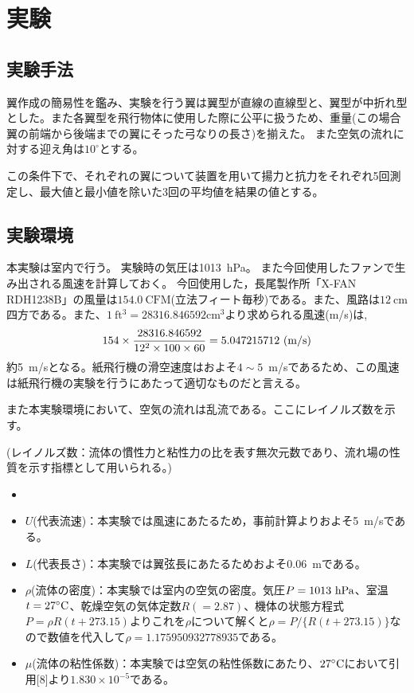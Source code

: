 \documentclass[11pt,b5paper,papersize,dvipdfmx]{jsbook}
\begin{document}
\section{実験}
\subsection{実験手法}
翼作成の簡易性を鑑み、実験を行う翼は翼型が直線の直線型と、翼型が中折れ型とした。また各翼型を飛行物体に使用した際に公平に扱うため、重量(この場合翼の前端から後端までの翼にそった弓なりの長さ)を揃えた。
また空気の流れに対する迎え角は$10^\circ$とする。\par
この条件下で、それぞれの翼について装置を用いて揚力と抗力をそれぞれ5回測定し、最大値と最小値を除いた3回の平均値を結果の値とする。
\subsection{実験環境}
本実験は室内で行う。
実験時の気圧は1013\ hPa。
また今回使用したファンで生み出される風速を計算しておく。
今回使用した，長尾製作所「X-FAN RDH1238B」の風量は$154.0\ \mathrm{CFM}$(立法フィート毎秒)である。また、風路は$12\ \mathrm{cm}$四方である。また、$1\ \mathrm{ft^3}= 28 316.846 592 \mathrm{cm^3}$より求められる風速(m/s)は,
\begin{align*}
  154 \times \frac{28316.846592}{12^2\times 100\times 60} = 5.047215712\ \rm{(m/s)}
\end{align*}
約5\ m/sとなる。紙飛行機の滑空速度はおよそ$4\sim 5$\ m/sであるため、この風速は紙飛行機の実験を行うにあたって適切なものだと言える。\par
 また本実験環境において、空気の流れは乱流である。ここにレイノルズ数を示す。\par
(レイノルズ数：流体の慣性力と粘性力の比を表す無次元数であり、流れ場の性質を示す指標として用いられる。)


\begin{itemize}
  \item[] \hspace{-2zw}{\bf [文字の定義と値]}
  \item $U$(代表流速)：本実験では風速にあたるため，事前計算よりおよそ5\ m/sである。
  \item $L$(代表長さ)：本実験では翼弦長にあたるためおよそ0.06\ mである。
  \item $\rho$(流体の密度)：本実験では室内の空気の密度。気圧$P = 1013\ \rm{hPa}$、室温$t =27^\circ \rm{C}$、乾燥空気の気体定数$R (= 2.87)$、機体の状態方程式$P=\rho R(t+273.15)$よりこれを$\rho$について解くと$\rho = P/\{R(t+273.15)\}$なので数値を代入して$\rho=1.175950932778935$である。
  \item $\mu$(流体の粘性係数)：本実験では空気の粘性係数にあたり、$27^\circ \rm{C}$において引用[8]より$1.830\times 10^{-5}$である。
\end{itemize}
\end{document}
